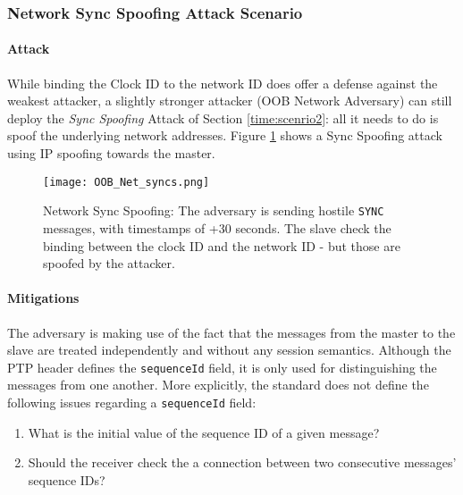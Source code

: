 \documentclass[11pt]{article}
\begin{document}
\subsubsection{Network Sync Spoofing Attack Scenario}\label{time:scenrio3}

\paragraph{Attack}

While binding the Clock ID to the network ID does offer a defense against the weakest attacker, a slightly stronger attacker (OOB Network Adversary) can still deploy the \emph{Sync Spoofing} Attack of Section \ref{time:scenrio2}: all it needs to do is spoof the underlying network addresses. Figure \ref{Net Sync Spoof} shows a Sync Spoofing attack using IP spoofing towards the master.



\begin{figure}[t]

\centerline{\texttt{[image: OOB\_Net\_syncs.png]}}

\caption{Network Sync Spoofing: The adversary is sending hostile \texttt{SYNC} messages, with timestamps of +30 seconds. The slave check the binding between the clock ID and the network ID - but those are spoofed by the attacker.}

\label{Net Sync Spoof}

\end{figure}



\paragraph{Mitigations}\label{time:scenrio3mit}

The adversary is making use of the fact that the messages from the master to the slave are treated independently and without any session semantics. Although the PTP header defines the \texttt{sequenceId} field, it is only used for distinguishing the messages from one another. More explicitly, the standard does not define the following issues regarding a \texttt{sequenceId} field:

\begin{enumerate}

  \item What is the initial value of the sequence ID of a given message?

  \item Should the receiver check the a connection between two consecutive messages' sequence IDs?

\end{enumerate}
\end{document}
